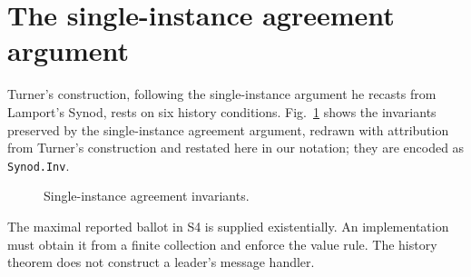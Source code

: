 \documentclass[10pt,journal,letterpaper]{IEEEtran}
\newcommand{\QI}{\mathcal Q^{\mathrm I}}
\newcommand{\QII}{\mathcal Q^{\mathrm {II}}}
\newcommand{\inter}{\mathrel{\frown}}
\newcommand{\chosen}{\operatorname{chosen}}
\newcommand{\proposed}{\operatorname{proposed}}
\newcommand{\promised}{\operatorname{promised}}
\newcommand{\accepted}{\operatorname{accepted}}
\newcommand{\code}[1]{\texttt{\small #1}}
\begin{document}
\section{The single-instance agreement argument}\label{sec:synod}
Turner's construction, following the single-instance argument he recasts from
Lamport's Synod, rests on six history conditions. Fig.~\ref{fig:synod} shows
the invariants preserved by the single-instance agreement argument, redrawn
with attribution from Turner's construction and restated here in our
notation; they are encoded as \code{Synod.Inv}.

\begin{figure}[t]
\centering
{}
\caption{Single-instance agreement invariants.}
\label{fig:synod}
\end{figure}

The maximal reported ballot in S4 is supplied existentially. An
implementation must obtain it from a finite collection and enforce the value
rule. The history theorem does not construct a leader's message handler.
\end{document}
